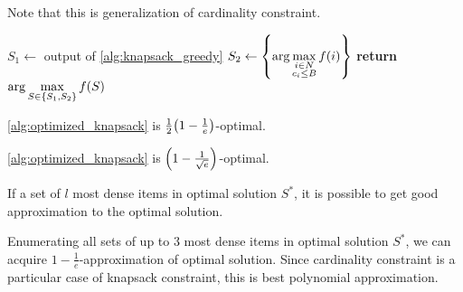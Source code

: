 Note that this is generalization of cardinality constraint.


\begin{algorithm}
	\caption{}\label{alg:optimized_knapsack}
	\begin{algorithmic}[1]
		\State $S_1 \gets$ output of \vref{alg:knapsack_greedy}
		\State $S_2 \gets \qty{\arg\max\limits_{\substack{i\in N\\c_i \leq B}} f(i)}$
		\State \textbf{return} $\arg\max\limits_{S\in \qty{S_1,S_2}} f(S)$
		\EndProcedure
	\end{algorithmic}
\end{algorithm}


\begin{prop}
	\vref{alg:optimized_knapsack} is $\frac{1}{2}\qty(1-\frac{1}{e})$-optimal.
\end{prop}
\begin{prop}
	\vref{alg:optimized_knapsack} is $\qty(1-\frac{1}{\sqrt{e}})$-optimal.
\end{prop}

\begin{theorem}
	If a set of $l$ most dense items in optimal solution $S^*$, it is possible to get good approximation to the optimal solution.
	
	Enumerating all sets of up to 3 most dense items in optimal solution $S^*$, we can acquire $1-\frac{1}{e}$-approximation of optimal solution. Since cardinality constraint is a particular case of knapsack constraint, this is best polynomial approximation.
\end{theorem}